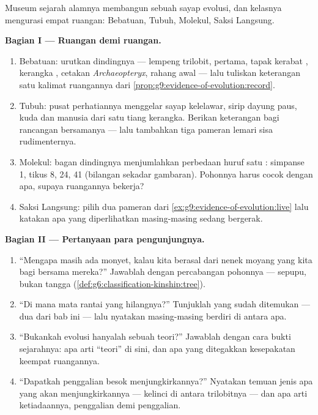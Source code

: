 \begin{problem}\label{pb:g9:evidence-of-evolution:1}
Museum sejarah alamnya membangun sebuah sayap evolusi, dan
kelasnya mengurasi empat ruangan: Bebatuan, Tubuh, Molekul,
Saksi Langsung.

\medskip\noindent\textbf{Bagian I --- Ruangan demi ruangan.}
\begin{enumerate}
  \item Bebatuan: urutkan dindingnya --- lempeng trilobit,
         pertama, tapak kerabat , kerangka ,
        cetakan \emph{Archaeopteryx}, rahang  awal ---
        lalu tuliskan keterangan satu kalimat ruangannya dari
        \cref{prop:g9:evidence-of-evolution:record}.
  \item Tubuh: pusat perhatiannya menggelar sayap kelelawar,
        sirip dayung paus,  kuda dan  manusia
        dari satu tiang kerangka. Berikan keterangan bagi
        rancangan bersamanya --- lalu tambahkan tiga pameran
        lemari sisa rudimenternya.
  \item Molekul: bagan dindingnya menjumlahkan perbedaan
        huruf satu : simpanse 1, tikus 8,  24,  41
        (bilangan sekadar gambaran). Pohonnya harus cocok
        dengan apa, supaya ruangannya bekerja?
  \item Saksi Langsung: pilih dua pameran dari
        \cref{ex:g9:evidence-of-evolution:live} lalu katakan
        apa yang diperlihatkan masing-masing sedang bergerak.
\end{enumerate}

\medskip\noindent\textbf{Bagian II --- Pertanyaan para
pengunjungnya.}
\begin{enumerate}[resume]
  \item ``Mengapa masih ada monyet, kalau kita berasal dari
        nenek moyang yang kita bagi bersama mereka?''
        Jawablah dengan percabangan pohonnya --- sepupu,
        bukan tangga (\cref{def:g6:classification-kinship:tree}).
  \item ``Di mana mata rantai yang hilangnya?'' Tunjuklah
        yang sudah ditemukan --- dua dari bab ini --- lalu
        nyatakan masing-masing berdiri di antara apa.
  \item ``Bukankah evolusi hanyalah sebuah teori?'' Jawablah
        dengan cara bukti sejarahnya: apa arti ``teori'' di
        sini, dan apa yang ditegakkan kesepakatan keempat
        ruangannya.
  \item ``Dapatkah penggalian besok menjungkirkannya?''
        Nyatakan temuan jenis apa yang akan menjungkirkannya
        --- kelinci di antara trilobitnya --- dan apa arti
        ketiadaannya, penggalian demi penggalian.
\end{enumerate}


\end{problem}
